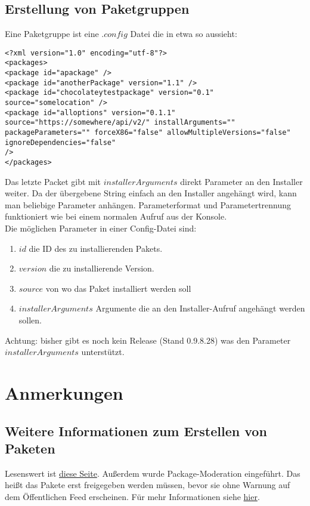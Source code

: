 \documentclass[10pt,a4paper]{article}
\begin{document}
\subsection{Erstellung von Paketgruppen}
Eine Paketgruppe ist eine $.config$ Datei die in etwa so aussieht:

\begin{lstlisting}
<?xml version="1.0" encoding="utf-8"?>
<packages>
<package id="apackage" />
<package id="anotherPackage" version="1.1" />
<package id="chocolateytestpackage" version="0.1" source="somelocation" />
<package id="alloptions" version="0.1.1"
source="https://somewhere/api/v2/" installArguments=""
packageParameters="" forceX86="false" allowMultipleVersions="false"
ignoreDependencies="false"
/>
</packages>
\end{lstlisting}

Das letzte Packet gibt mit $installerArguments$ direkt Parameter an den Installer weiter. Da der übergebene String einfach an den Installer angehängt wird, kann man beliebige Parameter anhängen. Parameterformat und Parametertrennung funktioniert wie bei einem normalen Aufruf aus der Konsole.
\\
Die möglichen Parameter in einer Config-Datei sind:
\begin{enumerate}
\item $id$ die ID des zu installierenden Pakets.
\item $version$ die zu installierende Version.
\item $source$ von wo das Paket installiert werden soll
\item $installerArguments$ Argumente die an den Installer-Aufruf angehängt werden sollen.
\end{enumerate}

Achtung: bisher gibt es noch kein Release (Stand 0.9.8.28) was den Parameter $installerArguments$ unterstützt.



\section{Anmerkungen}
\subsection{Weitere Informationen zum Erstellen von Paketen}
Lesenswert ist \href{https://github.com/chocolatey/chocolatey/wiki/HelpersReference}{diese Seite}.
Außerdem wurde Package-Moderation eingeführt. Das heißt das Pakete erst freigegeben werden müssen, bevor sie ohne Warnung auf dem  Öffentlichen Feed erscheinen. Für mehr Informationen siehe \href{http://codebetter.com/robreynolds/2014/10/27/chocolatey-now-has-package-moderation/}{hier}.
\end{document}
